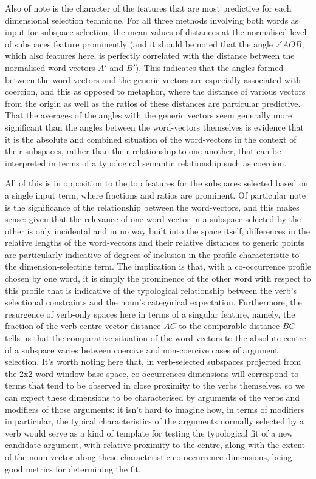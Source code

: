 Also of note is the character of the features that are most predictive for each dimensional selection technique.  For all three methods involving both words as input for subspace selection, the mean values of distances at the normalised level of subspaces feature prominently (and it should be noted that the angle $\angle AOB$, which also features here, is perfectly correlated with the distance between the normalised word-vectors $A'$ and $B'$).  This indicates that the angles formed between the word-vectors and the generic vectors are especially associated with coercion, and this as opposed to metaphor, where the distance of various vectors from the origin as well as the ratios of these distances are particular predictive.  That the averages of the angles with the generic vectors seem generally more significant than the angles between the word-vectors themselves is evidence that it is the absolute and combined situation of the word-vectors in the context of their subspaces, rather than their relationship to one another, that can be interpreted in terms of a typological semantic relationship such as coercion.

All of this is in opposition to the top features for the subspaces selected based on a single input term, where fractions and ratios are prominent.  Of particular note is the significance of the relationship between the word-vectors, and this makes sense: given that the relevance of one word-vector in a subspace selected by the other is only incidental and in no way built into the space itself, differences in the relative lengths of the word-vectors and their relative distances to generic points are particularly indicative of degrees of inclusion in the profile characteristic to the dimension-selecting term.  The implication is that, with a co-occurrence profile chosen by one word, it is simply the prominence of the other word with respect to this profile that is indicative of the typological relationship between the verb's selectional constraints and the noun's categorical expectation.  Furthermore, the resurgence of verb-only spaces here in terms of a singular feature, namely, the fraction of the verb-centre-vector distance $\overline{AC}$ to the comparable distance $\overline{BC}$ tells us that the comparative situation of the word-vectors to the absolute centre of a subspace varies between coercive and non-coercive cases of argument selection.  It's worth noting here that, in verb-selected subspaces projected from the 2x2 word window base space, co-occurrences dimensions will correspond to terms that tend to be observed in close proximity to the verbs themselves, so we can expect these dimensions to be characterised by arguments of the verbs and modifiers of those arguments: it isn't hard to imagine how, in terms of modifiers in particular, the typical characteristics of the arguments normally selected by a verb would serve as a kind of template for testing the typological fit of a new candidate argument, with relative proximity to the centre, along with the extent of the noun vector along these characteristic co-occurrence dimensions, being good metrics for determining the fit.

